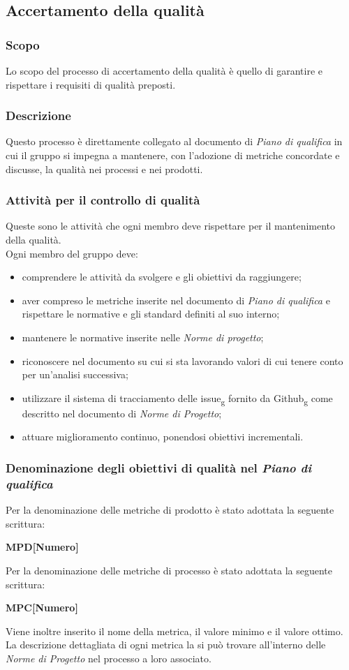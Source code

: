 \subsection{Accertamento della qualità}

\subsubsection{Scopo}
Lo scopo del processo di accertamento della qualità è quello di garantire e rispettare i requisiti di qualità preposti.
\subsubsection{Descrizione}
Questo processo è direttamente collegato al documento di \textit{Piano di qualifica} in cui il gruppo si impegna a mantenere, con l'adozione di metriche concordate e discusse, la qualità nei processi e nei prodotti.
\subsubsection{Attività per il controllo di qualità}
Queste sono le attività che ogni membro deve rispettare per il mantenimento della qualità.\\
Ogni membro del gruppo deve:
\begin{itemize}
\item comprendere le attività da svolgere e gli obiettivi da raggiungere;
\item aver compreso le metriche inserite nel documento di \textit{Piano di qualifica} e rispettare le normative e gli standard definiti al suo interno;
\item mantenere le normative inserite nelle \textit{Norme di progetto};
\item riconoscere nel documento su cui si sta lavorando valori di cui tenere conto per un'analisi successiva;
\item utilizzare il sistema di tracciamento delle issue\textsubscript{g} fornito da Github\textsubscript{g} come descritto nel documento di \textit{Norme di Progetto};
\item attuare miglioramento continuo, ponendosi obiettivi incrementali.
\end{itemize}
\subsubsection{Denominazione degli obiettivi di qualità nel \textit{Piano di qualifica}}
Per la denominazione delle metriche di prodotto è stato adottata la seguente scrittura:
\begin{center}\textbf{MPD[Numero]}\end{center}
Per la denominazione delle metriche di processo è stato adottata la seguente scrittura:
\begin{center}\textbf{MPC[Numero]}\end{center}
Viene inoltre inserito il nome della metrica, il valore minimo e il valore ottimo.\\
La descrizione dettagliata di ogni metrica la si può trovare all'interno delle \textit{Norme di Progetto} nel processo a loro associato.
